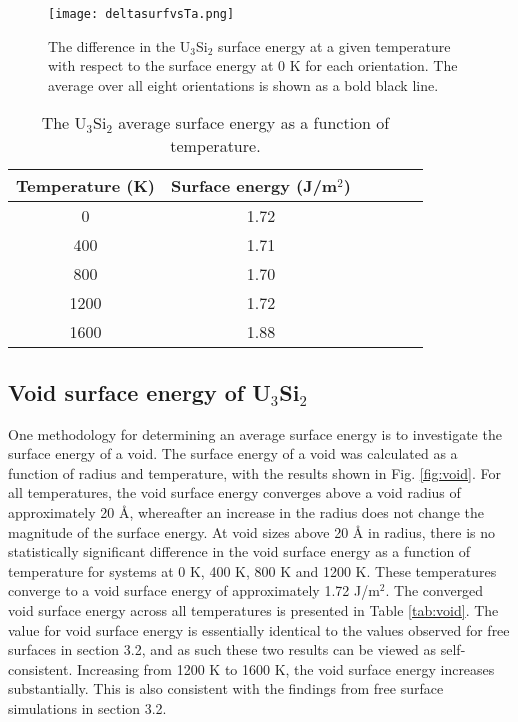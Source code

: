 \documentclass[review]{elsarticle}
\begin{document}
\begin{figure}[h]
 \centering
 \texttt{[image: deltasurfvsTa.png]} 
 \caption{The difference in the U$_{3}$Si$_{2}$ surface energy at a given temperature with respect to the surface energy at 0 K for each orientation. The average over all eight orientations is shown as a bold black line. }
 \label{fig:deltasurf}
\end{figure}

\begin{table}[h]
\caption{The U$_{3}$Si$_{2}$ average surface energy as a function of temperature.} \label{tab:surf}
\begin{center}
\begin{tabular}{|c|c|c|c|c|c|}
	\hline
	Temperature (K) & Surface energy (J/m$^{2}$)\\
	 \hline
	 0 & 1.72	 \\
	 400 & 1.71 \\
	 800 & 1.70	 \\
	 1200 & 1.72 \\
	 1600 & 1.88 \\
	 \hline
\end{tabular}
\end{center}
\label{default}
\end{table}




\FloatBarrier

\subsection{Void surface energy of U$_{3}$Si$_{2}$}

One methodology for determining an average surface energy is to investigate the surface energy of a void. The surface energy of a void was calculated as a function of radius and temperature, with the results shown in Fig. \ref{fig:void}. For all temperatures, the void surface energy converges above a void radius of approximately 20 {\AA}, whereafter an increase in the radius does not change the magnitude of the surface energy. At void sizes above 20 {\AA} in radius, there is no statistically significant difference in the void surface energy as a function of temperature for systems at 0 K, 400 K, 800 K and 1200 K. These temperatures converge to a void surface energy of approximately 1.72 J/m$^{2}$. The converged void surface energy across all temperatures is presented in Table \ref{tab:void}. The value for void surface energy is essentially identical to the values observed for free surfaces in section 3.2, and as such these two results can be viewed as self-consistent. Increasing from 1200 K to 1600 K, the void surface energy increases substantially. This is also consistent with the findings from free surface simulations in section 3.2. 
\end{document}

